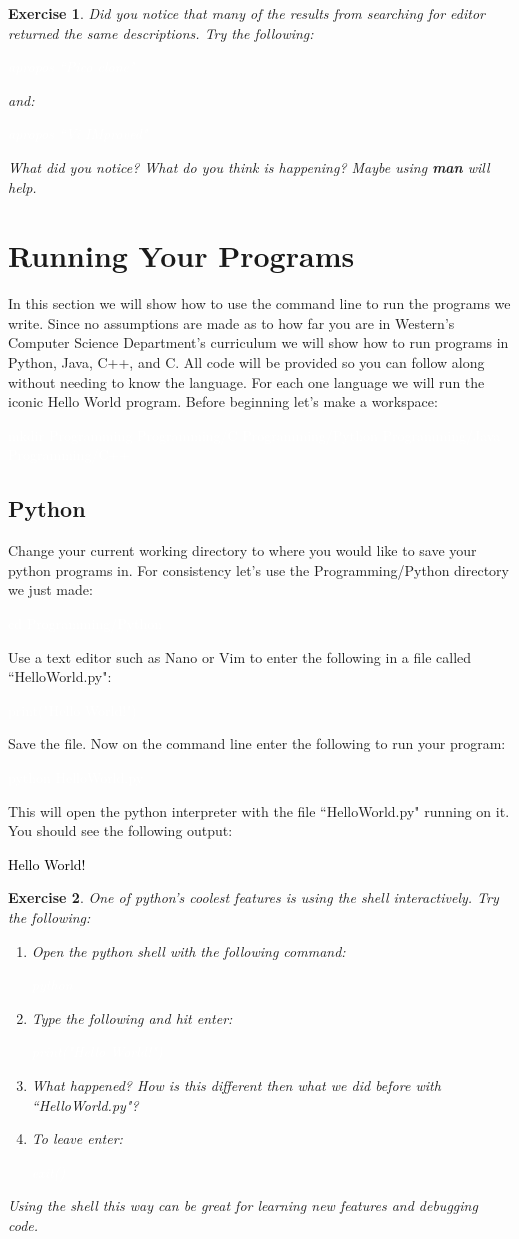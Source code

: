 \documentclass[oneside]{book}
\newcommand{\commandline}[1]{\begin{center} \colorbox{Dark}{\textcolor{white}{#1}} \end{center}}
\newcommand{\exampleout}[1]{\begin{center} \colorbox{Light}{\textcolor{black}{#1}} \end{center}}
\newtheorem{ex}{Exercise}[chapter]
\begin{document}
\begin{ex}
Did you notice that many of the results from searching for editor returned the same descriptions. Try the following:
\commandline{apropos ``Pico clone"}
and:
\commandline{apropos ``Vi IMproved"}
What did you notice? What do you think is happening? Maybe using \textbf{man} will help.
\end{ex}

\section{Running Your Programs}
In this section we will show how to use the command line to run the programs we write. Since no assumptions are made as to how far you are in Western's Computer Science Department's curriculum we will show how to run programs in Python, Java, C++, and C. All code will be provided so you can follow along without needing to know the language. For each one language we will run the iconic Hello World program. Before beginning let's make a workspace: 
\commandline{mkdir Programming Programming/C Programming/Python Programming/Java Programming/C++}
\subsection{Python}
Change your current working directory to where you would like to save your python programs in. For consistency let's use the Programming/Python directory we just made:
\commandline{cd Programming/Python}
Use a text editor such as Nano or Vim to enter the following in a file called ``HelloWorld.py":
\commandline{print("Hello World!")}
Save the file. Now on the command line enter the following to run your program:
\commandline{python HelloWorld.py}
This will open the python interpreter with the file ``HelloWorld.py" running on it. You should see the following output:
\exampleout{Hello World!}
\begin{ex}
    One of python's coolest features is using the shell interactively. Try the following:
    \begin{enumerate}
        \item Open the python shell with the following command:
            \commandline{python}
        \item Type the following and hit enter:
            \commandline{print("Hello World!")}
        \item What happened? How is this different then what we did before with ``HelloWorld.py"?
        \item To leave enter:
            \commandline{exit()}
    \end{enumerate}
    Using the shell this way can be great for learning new features and debugging code.
\end{ex}
\end{document}
